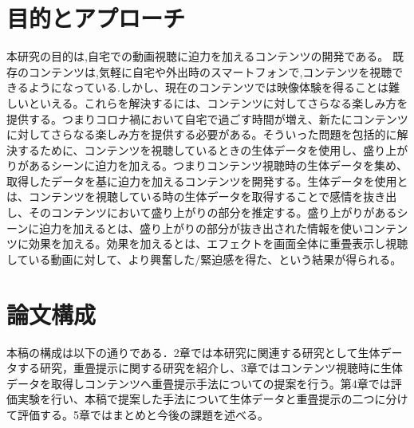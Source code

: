 \section{目的とアプローチ}
本研究の目的は,自宅での動画視聴に迫力を加えるコンテンツの開発である。
既存のコンテンツは,気軽に自宅や外出時のスマートフォンで,コンテンツを視聴できるようになっている.しかし、現在のコンテンツでは映像体験を得ることは難しいといえる。これらを解決するには、コンテンツに対してさらなる楽しみ方を提供する。つまりコロナ禍において自宅で過ごす時間が増え、新たにコンテンツに対してさらなる楽しみ方を提供する必要がある。そういった問題を包括的に解決するために、コンテンツを視聴しているときの生体データを使用し、盛り上がりがあるシーンに迫力を加える。つまりコンテンツ視聴時の生体データを集め、取得したデータを基に迫力を加えるコンテンツを開発する。生体データを使用とは、コンテンツを視聴している時の生体データを取得することで感情を抜き出し、そのコンテンツにおいて盛り上がりの部分を推定する。盛り上がりがあるシーンに迫力を加えるとは、盛り上がりの部分が抜き出された情報を使いコンテンツに効果を加える。効果を加えるとは、エフェクトを画面全体に重畳表示し視聴している動画に対して、より興奮した/緊迫感を得た、という結果が得られる。

\label{sec:example}


\section{論文構成}
本稿の構成は以下の通りである．2章では本研究に関連する研究として生体データする研究，重畳提示に関する研究を紹介し、3章ではコンテンツ視聴時に生体データを取得しコンテンツへ重畳提示手法についての提案を行う。第4章では評価実験を行い、本稿で提案した手法について生体データと重畳提示の二つに分けて評価する。5章ではまとめと今後の課題を述べる。

